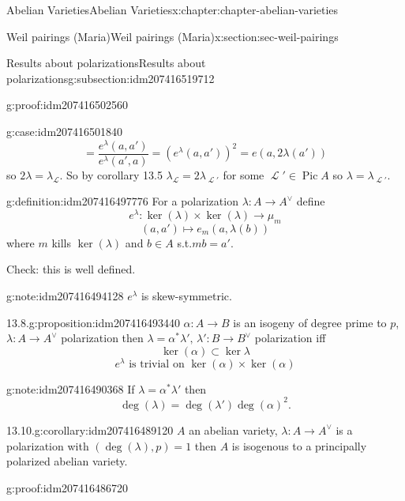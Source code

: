 \documentclass[oneside,10pt,]{book}
\numberwithin{equation}{section}
\newcommand{\sheaf}[1]{\operatorname{\mathcal{#1}}}
\DeclareMathOperator{\Pic}{Pic}
\begin{document}
\begin{chapterptx}{Abelian Varieties}{}{Abelian Varieties}{}{}{x:chapter:chapter-abelian-varieties}
\begin{sectionptx}{Weil pairings (Maria)}{}{Weil pairings (Maria)}{}{}{x:section:sec-weil-pairings}
\begin{subsectionptx}{Results about polarizations}{}{Results about polarizations}{}{}{g:subsection:idm207416519712}
\begin{proofptx}{}{g:proof:idm207416502560}
\begin{case}{}{}{g:case:idm207416501840}
\begin{equation*}
= \frac{e^\lambda(a,a')}{ e^\lambda(a',a)} = (e^\lambda(a,a'))^2 = e(a,2\lambda (a'))
\end{equation*}
so \(2\lambda = \lambda_{\sheaf L}\). So by corollary 13.5 \(\lambda_{\sheaf L} = 2\lambda_{\sheaf L'}\) for some \(\sheaf L' \in \Pic A\) so \(\lambda = \lambda_{\sheaf L'}\).%
\end{case}
\end{proofptx}
\begin{definition}{}{g:definition:idm207416497776}%
For a  polarization \(\lambda \colon A\to A^\vee\) define%
\begin{equation*}
e^{\lambda} \colon \ker(\lambda)\times \ker(\lambda) \to \mu_m
\end{equation*}
%
\begin{equation*}
(a,a')\mapsto e_m(a,\lambda(b))
\end{equation*}
where \(m \) kills \(\ker(\lambda)\) and \(b \in A\) s.t.\(mb = a'\).%
\end{definition}
Check: this is well defined.%
\begin{note}{}{g:note:idm207416494128}%
\(e^\lambda\) is skew-symmetric.%
\end{note}
\begin{proposition}{13.8.}{}{g:proposition:idm207416493440}%
\(\alpha\colon A \to B\) is an isogeny of degree prime to \(p\), \(\lambda\colon A\to A^\vee\) polarization then \(\lambda = \alpha^* \lambda', \,\lambda' \colon B\to B^\vee\) polarization iff%
\begin{equation*}
\ker(\alpha) \subset \ker \lambda
\end{equation*}
%
\begin{equation*}
e^{\lambda} \text{ is trivial on } \ker (\alpha)\times \ker(\alpha)
\end{equation*}
%
\end{proposition}
\begin{note}{}{g:note:idm207416490368}%
If \(\lambda = \alpha^* \lambda'\) then%
\begin{equation*}
\deg(\lambda) = \deg (\lambda') \deg(\alpha)^2\text{.}
\end{equation*}
%
\end{note}
\begin{corollary}{13.10.}{}{g:corollary:idm207416489120}%
\(A\) an abelian variety, \(\lambda \colon A \to A^\vee\) is a polarization with \((\deg (\lambda), p) = 1\) then \(A\) is  isogenous to a principally polarized abelian variety.%
\end{corollary}
\begin{proofptx}{}{g:proof:idm207416486720}

\end{proofptx}
\end{subsectionptx}
\end{sectionptx}
\end{chapterptx}
\end{document}
